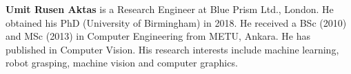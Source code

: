 \documentclass{ws-ijhr}
\begin{document}








\vspace*{-5pt}   %


\eject


\noindent%
\parbox{5truein}{
\begin{minipage}[b]{1truein}
\centerline{{}}
\end{minipage}
\hfill         %
\begin{minipage}[b]{3.85truein}
{{\bf Umit Rusen Aktas} is a Research Engineer at Blue Prism Ltd., London. He obtained his PhD (University of Birmingham) in 2018. He received a BSc (2010) and MSc (2013) in Computer Engineering from METU, Ankara. He has published in Computer Vision. His research interests include machine learning, robot grasping, machine vision and computer graphics.\hfilneg}
\end{minipage}} %
\end{document}
